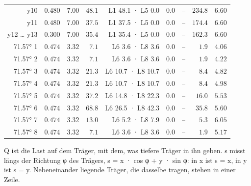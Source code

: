 \documentclass[11pt,a4paper]{article}
\begin{document}
\begin{longtable}{rrrrrrrrr}
y10 & $0.480$ & $7.00$ & $48.1$ & L1 48.1 · L5 0.0 & $0.0$ & – & $234.8$ & $6.60$ \\
y11 & $0.480$ & $7.00$ & $37.5$ & L1 37.5 · L5 0.0 & $0.0$ & – & $174.4$ & $6.60$ \\
y12 … y13 & $0.300$ & $7.00$ & $35.4$ & L1 35.4 · L5 0.0 & $0.0$ & – & $162.3$ & $6.60$ \\
71.57° 1 & $0.474$ & $3.32$ & $7.1$ & L6 3.6 · L8 3.6 & $0.0$ & – & $1.9$ & $4.06$ \\
71.57° 2 & $0.474$ & $3.32$ & $7.1$ & L6 3.6 · L8 3.6 & $0.0$ & – & $1.9$ & $4.22$ \\
71.57° 3 & $0.474$ & $3.32$ & $21.3$ & L6 10.7 · L8 10.7 & $0.0$ & – & $8.4$ & $4.82$ \\
71.57° 4 & $0.474$ & $3.32$ & $21.3$ & L6 10.7 · L8 10.7 & $0.0$ & – & $8.4$ & $4.98$ \\
71.57° 5 & $0.474$ & $3.32$ & $37.2$ & L6 14.8 · L8 22.3 & $0.0$ & – & $16.0$ & $5.53$ \\
71.57° 6 & $0.474$ & $3.32$ & $68.8$ & L6 26.5 · L8 42.3 & $0.0$ & – & $35.8$ & $5.60$ \\
71.57° 7 & $0.474$ & $3.32$ & $13.0$ & L6 5.2 · L8 7.9 & $0.0$ & – & $5.3$ & $6.05$ \\
71.57° 8 & $0.474$ & $3.32$ & $7.1$ & L6 3.6 · L8 3.6 & $0.0$ & – & $1.9$ & $5.17$ \\
\hline
\end{longtable}
Q ist die Last auf dem Träger, mit dem, was tiefere Träger in ihn geben. s misst längs der Richtung φ des Trägers, s = x · cos φ + y · sin φ: in x ist s = x, in y ist s = y. Nebeneinander liegende Träger, die dasselbe tragen, stehen in einer Zeile.
\end{document}
